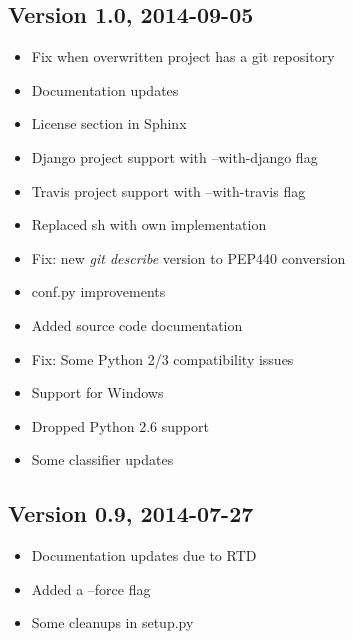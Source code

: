 \documentclass[letterpaper,10pt,english]{sphinxmanual}
\begin{document}
\subsection{Version 1.0, 2014-09-05}
\label{changes:version-1-0-2014-09-05}\begin{itemize}
\item {} 
Fix when overwritten project has a git repository

\item {} 
Documentation updates

\item {} 
License section in Sphinx

\item {} 
Django project support with --with-django flag

\item {} 
Travis project support with --with-travis flag

\item {} 
Replaced sh with own implementation

\item {} 
Fix: new \emph{git describe} version to PEP440 conversion

\item {} 
conf.py improvements

\item {} 
Added source code documentation

\item {} 
Fix: Some Python 2/3 compatibility issues

\item {} 
Support for Windows

\item {} 
Dropped Python 2.6 support

\item {} 
Some classifier updates

\end{itemize}


\subsection{Version 0.9, 2014-07-27}
\label{changes:version-0-9-2014-07-27}\begin{itemize}
\item {} 
Documentation updates due to RTD

\item {} 
Added a --force flag

\item {} 
Some cleanups in setup.py

\end{itemize}
\end{document}
